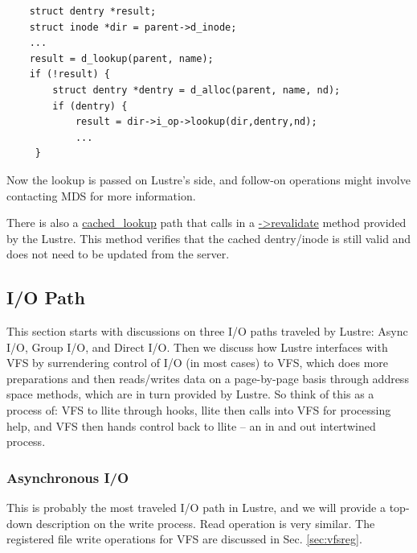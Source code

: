 \begin{Verbatim}
    struct dentry *result;
    struct inode *dir = parent->d_inode;
    ...
    result = d_lookup(parent, name);
    if (!result) {
        struct dentry *dentry = d_alloc(parent, name, nd);
        if (dentry) {
            result = dir->i_op->lookup(dir,dentry,nd);
            ...
     }
\end{Verbatim}

Now the lookup is passed on Lustre's side, and follow-on operations might
involve contacting MDS for more information.

There is also a \url{cached_lookup} path that calls in a \url{->revalidate}
method provided by the Lustre. This method verifies that the cached dentry/inode is
still valid and does not need to be updated from the server.

\subsection{I/O Path}

This section starts with discussions on three I/O paths traveled by Lustre:
Async I/O, Group I/O, and Direct I/O. Then we discuss how Lustre interfaces
with VFS by surrendering control of I/O (in most cases) to VFS,
which does more preparations and then reads/writes data on a page-by-page
basis through address space methods, which are in turn provided by Lustre. So
think of this as a process of: VFS to llite through hooks, llite then calls
into VFS for processing help, and VFS then hands control back to llite --
an in and out intertwined process. 

\subsubsection{Asynchronous I/O}

This is probably the most traveled I/O path in Lustre, and we will provide a
top-down description on the write process. Read operation is very similar. The
registered file write operations for VFS are discussed in Sec.
\ref{sec:vfsreg}.

